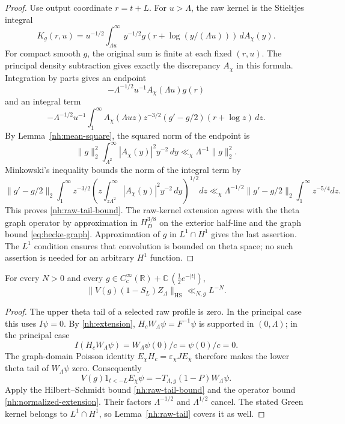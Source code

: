 \begin{proof}
Use output coordinate $r=t+L$. For $u>\Lambda$, the raw
kernel is the Stieltjes integral
\[
 K_g(r,u)=u^{-1/2}\int_{\Lambda u}^\infty
        y^{-1/2}g(r+\log(y/(\Lambda u)))\,dA_\chi(y).
\]
For compact smooth $g$, the original sum is finite at each
fixed $(r,u)$. The principal density subtraction gives exactly
the discrepancy $A_\chi$ in this formula.
Integration by parts gives an endpoint
\[
 -\Lambda^{-1/2}u^{-1}A_\chi(\Lambda u)g(r)
\]
and an integral term
\[
 -\Lambda^{-1/2}u^{-1}
       \int_1^\infty A_\chi(\Lambda u z)z^{-3/2}
                    (g'-g/2)(r+\log z)\,dz.
\]
By Lemma~\ref{nh:mean-square}, the squared norm of the
endpoint is
\[
 \|g\|_2^2\int_{\Lambda^2}^\infty
                  |A_\chi(y)|^2y^{-2}\,dy
                       \ll_\chi\Lambda^{-1}\|g\|_2^2.
\]
Minkowski's inequality bounds the norm of the integral term by
\[
 \|g'-g/2\|_2
 \int_1^\infty z^{-3/2}
 \left(z\int_{z\Lambda^2}^\infty
                       |A_\chi(y)|^2y^{-2}\,dy\right)^{1/2}dz
 \ll_\chi\Lambda^{-1/2}\|g'-g/2\|_2
                         \int_1^\infty z^{-5/4}dz.
\]
This proves \eqref{nh:raw-tail-bound}.
The raw-kernel extension agrees with the theta graph
operator by approximation in $H_D^{3/8}$ on the exterior
half-line and the graph bound \eqref{eq:hecke-graph}.
Approximation of $g$ in $L^1\cap H^1$ gives the last assertion.
The $L^1$ condition ensures that convolution is bounded on
theta space; no such assertion is needed for an arbitrary
$H^1$ function.
\end{proof}

\begin{proposition}
\label{nh:leakage}
For every $N>0$ and every
$g\in C_c^\infty(\mathbb R)+\mathbb C\,(\tfrac12e^{-|t|})$,
\begin{equation}\label{nh:leakage-bound}
 \|V(g)(1-S_L)Z_\Lambda\|_{\mathrm{HS}}
                         \ll_{N,g}L^{-N}.
\end{equation}
\end{proposition}

\begin{proof}
The upper theta tail of a selected raw profile is zero.
In the principal case this uses $I\psi=0$.
By \eqref{nh:extension}, $H_cW_\Lambda\psi=F^{-1}\psi$
is supported in $(0,\Lambda)$; in the principal case
\[
 I(H_cW_\Lambda\psi)=W_\Lambda\psi(0)/c=\psi(0)/c=0.
\]
The graph-domain Poisson identity
$E_\chi H_c=\varepsilon_\chi J E_{\bar\chi}$ therefore
makes the lower theta tail of $W_\Lambda\psi$ zero.
Consequently
\[
 V(g)1_{t<-L}E_\chi\psi
       =-T_{\Lambda,g}(1-P)W_\Lambda\psi.
\]
Apply the Hilbert--Schmidt bound \eqref{nh:raw-tail-bound}
and the operator bound \eqref{nh:normalized-extension}.
Their factors $\Lambda^{-1/2}$ and $\Lambda^{1/2}$ cancel.
The stated Green kernel belongs to $L^1\cap H^1$,
so Lemma~\ref{nh:raw-tail} covers it as well.
\end{proof}

